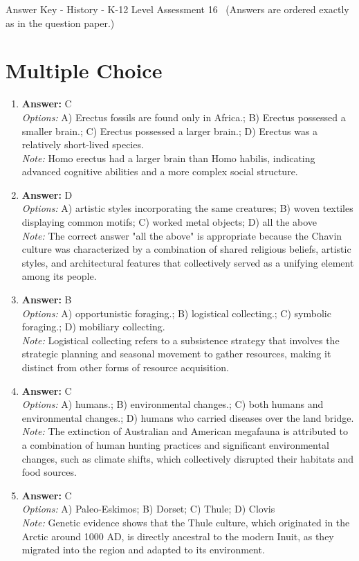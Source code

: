 \documentclass[12pt]{article}
\begin{document}
\begin{center}
Answer Key - History - K-12 Level Assessment 16 \
\small (Answers are ordered exactly as in the question paper.)
\end{center}

\section*{Multiple Choice}
\begin{enumerate}[label=\arabic*.]
\item \textbf{Answer:} C
\\ \textit{Options:} A) Erectus fossils are found only in Africa.; B) Erectus possessed a smaller brain.; C) Erectus possessed a larger brain.; D) Erectus was a relatively short-lived species.
\\ \textit{Note:} Homo erectus had a larger brain than Homo habilis, indicating advanced cognitive abilities and a more complex social structure.
\item \textbf{Answer:} D
\\ \textit{Options:} A) artistic styles incorporating the same creatures; B) woven textiles displaying common motifs; C) worked metal objects; D) all the above
\\ \textit{Note:} The correct answer "all the above" is appropriate because the Chavin culture was characterized by a combination of shared religious beliefs, artistic styles, and architectural features that collectively served as a unifying element among its people.
\item \textbf{Answer:} B
\\ \textit{Options:} A) opportunistic foraging.; B) logistical collecting.; C) symbolic foraging.; D) mobiliary collecting.
\\ \textit{Note:} Logistical collecting refers to a subsistence strategy that involves the strategic planning and seasonal movement to gather resources, making it distinct from other forms of resource acquisition.
\item \textbf{Answer:} C
\\ \textit{Options:} A) humans.; B) environmental changes.; C) both humans and environmental changes.; D) humans who carried diseases over the land bridge.
\\ \textit{Note:} The extinction of Australian and American megafauna is attributed to a combination of human hunting practices and significant environmental changes, such as climate shifts, which collectively disrupted their habitats and food sources.
\item \textbf{Answer:} C
\\ \textit{Options:} A) Paleo-Eskimos; B) Dorset; C) Thule; D) Clovis
\\ \textit{Note:} Genetic evidence shows that the Thule culture, which originated in the Arctic around 1000 AD, is directly ancestral to the modern Inuit, as they migrated into the region and adapted to its environment.
\end{enumerate}
\end{document}
